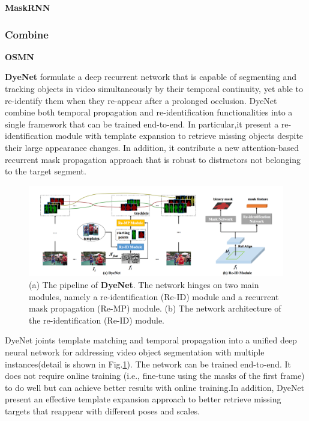 \textbf{MaskRNN}\cite{MaskRNN}


\subsubsection{Combine}

\textbf{OSMN}\cite{OSMN}

\textbf{DyeNet}\cite{DyeNet} formulate a deep recurrent network that is capable of segmenting and tracking objects in video simultaneously by their temporal continuity, yet able to re-identify them when they re-appear after a prolonged occlusion. DyeNet combine both temporal propagation and re-identification functionalities into a single framework that can be trained end-to-end. In particular,it present a re-identification module with template expansion to retrieve missing objects despite their large appearance changes. In addition, it contribute a new attention-based recurrent mask propagation approach that is robust to distractors not belonging to the target segment.

\begin{figure}[ht]
    \centering
    \includegraphics[width=\textwidth]{./figure/DyeNet.png}
    \caption{(a) The pipeline of \textbf{DyeNet}. The network hinges on two main modules, namely a re-identification (Re-ID) module and a recurrent mask propagation (Re-MP) module. (b) The network architecture of the re-identification (Re-ID) module.}
    \label{DyeNet}
\end{figure}

DyeNet joints template matching and temporal propagation into a unified deep neural network for addressing video object segmentation with multiple instances(detail is shown in Fig.\ref{DyeNet}). The network can be trained end-to-end. It does not require online training (i.e., fine-tune using the masks of the first frame) to do well but can achieve better results with online training.In addition, DyeNet present an effective template expansion approach to better retrieve missing targets that reappear with different poses and scales.




